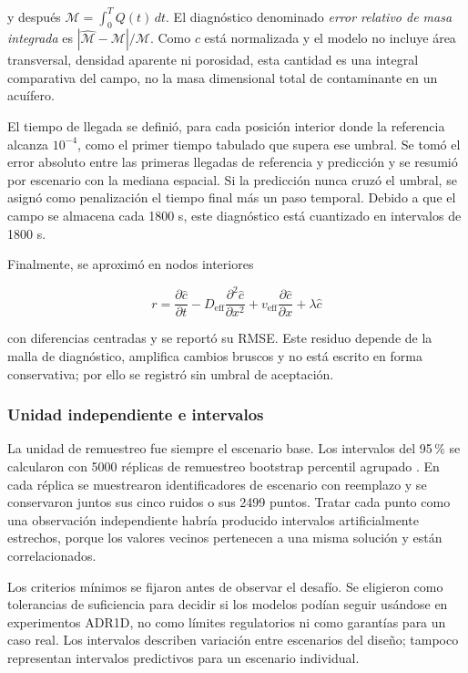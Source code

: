 \documentclass[11pt,a4paper]{article}
\begin{document}
y después $\mathcal M=\int_0^TQ(t)\,dt$. El diagnóstico denominado
\emph{error relativo de masa integrada} es
$|\widehat{\mathcal M}-\mathcal M|/\mathcal M$. Como $c$ está normalizada y el
modelo no incluye área transversal, densidad aparente ni porosidad, esta
cantidad es una integral comparativa del campo, no la masa dimensional total de
contaminante en un acuífero.

El tiempo de llegada se definió, para cada posición interior donde la referencia
alcanza $10^{-4}$, como el primer tiempo tabulado que supera ese umbral. Se tomó
el error absoluto entre las primeras llegadas de referencia y predicción y se
resumió por escenario con la mediana espacial. Si la predicción nunca cruzó el
umbral, se asignó como penalización el tiempo final más un paso temporal. Debido
a que el campo se almacena cada 1800 s, este diagnóstico está cuantizado en
intervalos de 1800 s.

Finalmente, se aproximó en nodos interiores

\begin{equation}
r=\frac{\partial \widehat c}{\partial t}
-D_{\mathrm{eff}}\frac{\partial^2\widehat c}{\partial x^2}
+v_{\mathrm{eff}}\frac{\partial\widehat c}{\partial x}
+\lambda\widehat c
\label{eq:pde-residual}
\end{equation}

con diferencias centradas y se reportó su RMSE. Este residuo depende de la
malla de diagnóstico, amplifica cambios bruscos y no está escrito en forma
conservativa; por ello se registró sin umbral de aceptación.

\subsubsection{Unidad independiente e intervalos}

La unidad de remuestreo fue siempre el escenario base. Los intervalos del
95\,\% se calcularon con 5000 réplicas de remuestreo bootstrap percentil agrupado
\cite{efron1993}. En cada réplica se muestrearon identificadores de escenario
con reemplazo y se conservaron juntos sus cinco ruidos o sus 2499 puntos. Tratar
cada punto como una observación independiente habría producido intervalos
artificialmente estrechos, porque los valores vecinos pertenecen a una misma
solución y están correlacionados.

Los criterios mínimos se fijaron antes de observar el desafío. Se eligieron
como tolerancias de suficiencia para decidir si los modelos podían seguir
usándose en experimentos ADR1D, no como límites regulatorios ni como garantías
para un caso real. Los intervalos describen variación entre escenarios del
diseño; tampoco representan intervalos predictivos para un escenario
individual.
\end{document}
